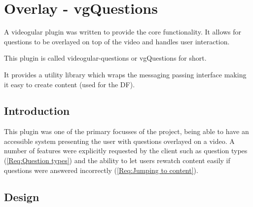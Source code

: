 
\chapter{Overlay - vgQuestions} \label{Chapter:Overlay}

\begin{preamble}
A videogular plugin was written to provide the core functionality. It allows for questions to be overlayed on top of the video and handles user interaction.

This plugin is called videogular-questions or \gls{vgQuestions} for short.

It provides a utility library which wraps the messaging passing interface making it easy to create content (used for the \gls{DF}).

\end{preamble}

\section{Introduction}

This plugin was one of the primary focusses of the project, being able to have an accessible system presenting the user with questions overlayed on a video. A number of features were explicitly requested by the client such as question types (\cref{Req:Question types}) and the ability to let users rewatch content easily if questions were answered incorrectly (\cref{Req:Jumping to content}).

\section{Design}

